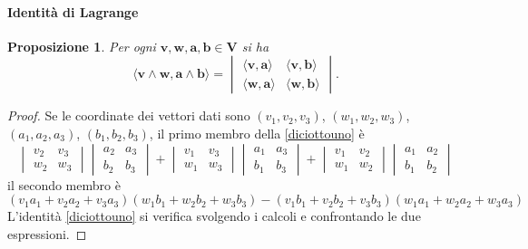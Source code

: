 \documentclass{article}
\theoremstyle{plain}
\newtheorem{prop}[thm]{Proposizione}
\theoremstyle{definition}
\theoremstyle{remark}
\begin{document}
\paragraph{Identità di Lagrange}
\begin{bxthm}
\begin{prop}
Per ogni $\mathbf{v}, \mathbf{w}, \mathbf{a}, \mathbf{b} \in \mathbf{V}$ si ha
\begin{equation}\label{diciottouno}
\langle \mathbf{v} \wedge \mathbf{w}, \mathbf{a} \wedge \mathbf{b} \rangle 
= 
\begin{vmatrix}
\langle \mathbf{v}, \mathbf{a} \rangle & \langle \mathbf{v}, \mathbf{b} \rangle \\
\langle \mathbf{w}, \mathbf{a} \rangle & \langle \mathbf{w}, \mathbf{b} \rangle
\end{vmatrix}.    
\end{equation}
\end{prop}
\end{bxthm}
\begin{proof}
Se le coordinate dei vettori dati sono $(v_1, v_2, v_3)$, $(w_1, w_2, w_3)$, $(a_1, a_2, a_3)$, 
$(b_1, b_2, b_3)$, il primo membro della \ref{diciottouno} è
\[\begin{vmatrix}
v_2 & v_3  \\
w_2 & w_3 
\end{vmatrix}
\begin{vmatrix}
a_2 & a_3 \\
b_2 & b_3
\end{vmatrix}
 + \begin{vmatrix}
v_1 & v_3  \\
w_1 & w_3 
\end{vmatrix}
\begin{vmatrix}
 a_1 & a_3 \\
 b_1 & b_3
\end{vmatrix}
 + \begin{vmatrix}
v_1 & v_2  \\
w_1 & w_2 
\end{vmatrix}
\begin{vmatrix}
a_1 & a_2 \\
b_1 & b_2
\end{vmatrix}\]
il secondo membro è
\[
(v_1 a_1 + v_2 a_2 + v_3 a_3)(w_1 b_1 + w_2 b_2 + w_3 b_3) - (v_1 b_1 + v_2 b_2 + v_3 b_3)(w_1 a_1 + w_2 a_2 + w_3 a_3)
\]
L'identità \ref{diciottouno} si verifica svolgendo i calcoli e confrontando le due espressioni.    
\end{proof}
\end{document}
